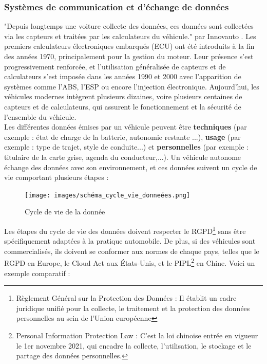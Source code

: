 \subsubsection{Systèmes de communication et d’échange de données}
"Depuis longtemps une voiture collecte des données, ces données sont collectées via les capteurs et traitées par les calculateurs du véhicule." par Innovauto \cite{donnees_echange}. Les premiers calculateurs électroniques embarqués (ECU) ont été introduits à la fin des années 1970, principalement pour la gestion du moteur. Leur présence s’est progressivement renforcée, et l’utilisation généralisée de capteurs et de calculateurs s’est imposée dans les années 1990 et 2000 avec l’apparition de systèmes comme l’ABS, l’ESP ou encore l’injection électronique. Aujourd’hui, les véhicules modernes intègrent plusieurs dizaines, voire plusieurs centaines de capteurs et de calculateurs, qui assurent le fonctionnement et la sécurité de l’ensemble du véhicule. \\
Les différentes données émises par un véhicule peuvent être \textbf{techniques} (par exemple : état de charge de la batterie, autonomie restante ...), \textbf{usage} (par exemple : type de trajet, style de conduite...) et \textbf{personnelles} (par exemple : titulaire de la carte grise, agenda du conducteur,...).
Un véhicule autonome échange des données avec son environnement, et ces données suivent un cycle de vie comportant plusieurs étapes :
\begin{figure}[H]
    \centering
    \texttt{[image: images/schéma\_cycle\_vie\_donneées.png]} 
    \caption{Cycle de vie de la donnée}
\end{figure}
Les étapes du cycle de vie des données doivent respecter le RGPD\footnote{Règlement Général sur la Protection des Données : Il établit un cadre juridique unifié pour la collecte, le traitement et la protection des données personnelles au sein de l’Union européenne} sans être spécifiquement adaptées à la pratique automobile. De plus, si des véhicules sont commercialisés, ils doivent se conformer aux normes de chaque pays, telles que le RGPD en Europe, le Cloud Act aux États-Unis, et le PIPL\footnote{ Personal Information Protection Law : C’est la loi chinoise entrée en vigueur le 1er novembre 2021, qui encadre la collecte, l’utilisation, le stockage et le partage des données personnelles.} en Chine. Voici un exemple comparatif :
